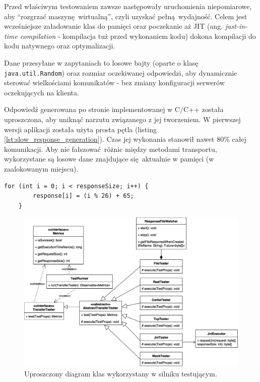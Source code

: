Przed właściwym testowaniem zawsze następowały uruchomienia niepomiarowe, aby \enquote{rozgrzać maszynę wirtualną}, czyli uzyskać pełną wydajność. Celem jest wcześniejsze załadowanie klas do pamięci oraz poczekanie aż JIT (ang. \textit{just-in-time compilation} - kompilacja tuż przed wykonaniem kodu) dokona kompilacji do kodu natywnego oraz optymalizacji.

\label{data_generation}
Dane przesyłane w zapytaniach to losowe bajty (oparte o klasę \texttt{java.util.Random}) oraz rozmiar oczekiwanej odpowiedzi, aby dynamicznie sterować wielkościami komunikatów - bez zmiany konfiguracji serwerów oczekujących na klienta.

Odpowiedź generowana po stronie implementowanej w C/C++ została uproszczona, aby uniknąć narzutu związanego z jej tworzeniem. W pierwszej wersji aplikacji została użyta prosta pętla (listing \ref{lst:slow_response_generation}).
Czas jej wykonania stanowił nawet 80\% całej komunikacji. Aby nie fałszować różnic między metodami transportu, wykorzystane są losowe dane znajdujące się aktualnie w pamięci (w zaalokowanym miejscu).

\begin{lstlisting}[caption={Sposób generowania odpowiedzi, który okazał się zbyt niewydajny, aby móc go zastosować.},captionpos=b,label={lst:slow_response_generation}]
    for (int i = 0; i < responseSize; i++) {
        response[i] = (i % 26) + 65;
    }
\end{lstlisting}

\begin{figure}[H]
    \centering
    \includegraphics[width=\textwidth,height=\textheight,keepaspectratio]{img/class_diagram.png}
    \caption{Uproszczony diagram klas wykorzystany w silniku testującym.}
\end{figure}

